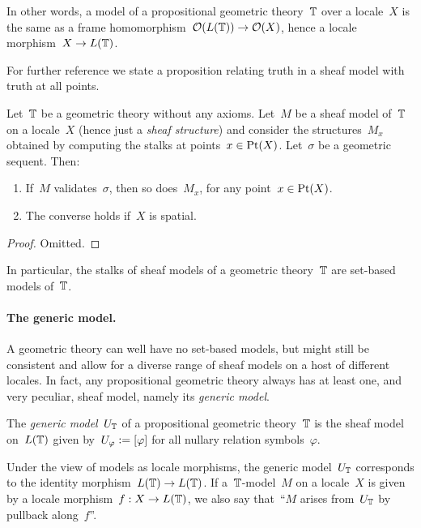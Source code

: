 \documentclass{ws-rv9x6}
\begin{document}
{In other words, a model of a propositional geometric theory~$\mathbb{T}$ over a
locale~$X$ is the same as a frame homomorphism~$\mathcal{O}(L(\mathbb{T})) \to \mathcal{O}(X)$, hence a
locale morphism~$X \to L(\mathbb{T})$.

For further reference we state a proposition relating truth in a sheaf model
with truth at all points.

\begin{proposition}\label{prop:at-points}
Let~$\mathbb{T}$ be a geometric theory without any axioms. Let~$M$ be a sheaf model
of~$\mathbb{T}$ on a locale~$X$ (hence just a \emph{sheaf structure}) and consider
the structures~$M_x$ obtained by computing the stalks at points~$x \in \mathrm{Pt}(X)$.
Let~$\sigma$ be a geometric sequent.
Then:
\begin{enumerate}
\item If~$M$ validates~$\sigma$, then so does~$M_x$, for any point~$x \in \mathrm{Pt}(X)$.
\item The converse holds if~$X$ is spatial.
\end{enumerate}
\end{proposition}

\begin{proof}Omitted.\end{proof}

In particular, the stalks of sheaf models of a geometric theory~$\mathbb{T}$ are
set-based models of~$\mathbb{T}$.

\paragraph{The generic model.}
A geometric theory can well have no set-based models, but might still be
consistent and allow for a diverse range of sheaf models on a host of different
locales. In fact, any propositional geometric theory always has at least one,
and very peculiar, sheaf model, namely its \emph{generic model}.

\begin{definition}The \emph{generic model}~$U_{\mathbb{T}}$ of a propositional geometric
theory~$\mathbb{T}$ is the sheaf model on~$L(\mathbb{T})$ given by~$U_\varphi \vcentcolon=
[\varphi]$ for all nullary relation symbols~$\varphi$.\end{definition}

Under the view of models as locale morphisms, the generic model~$U_{\mathbb{T}}$
corresponds to the identity morphism~$L(\mathbb{T}) \to L(\mathbb{T})$. If a~$\mathbb{T}$-model~$M$ on
a locale~$X$ is given by a locale morphism~$f : X \to L(\mathbb{T})$, we also say
that~``$M$ arises from~$U_{\mathbb{T}}$ by pullback along~$f$''.

}
\end{document}

